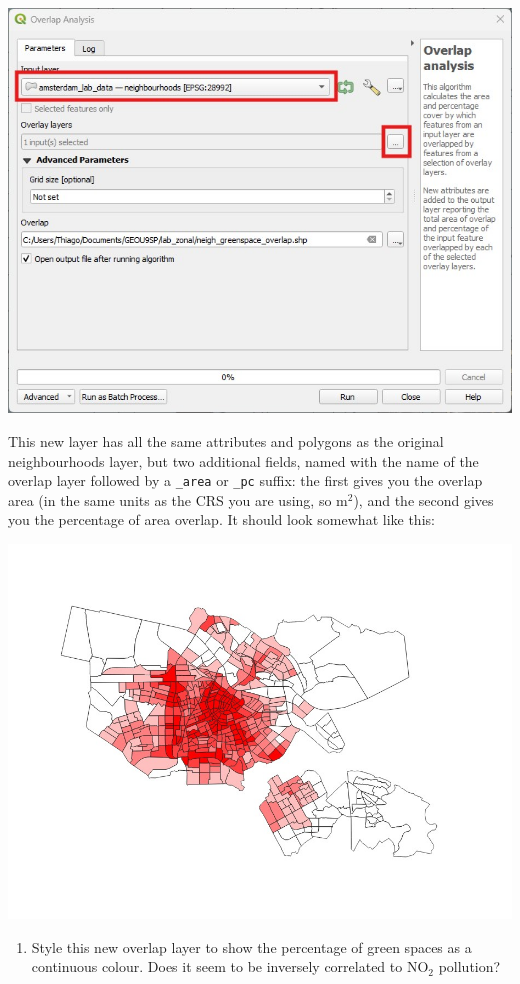 \documentclass[
  letterpaper,
  DIV=11,
  numbers=noendperiod]{scrreprt}
\providecommand{\tightlist}{%
  \setlength{\itemsep}{0pt}\setlength{\parskip}{0pt}}\usepackage{longtable,booktabs,array}
\begin{document}
\includegraphics{images/lab_12/lab12_fig2_overlap.jpg}

This new layer has all the same attributes and polygons as the original
neighbourhoods layer, but two additional fields, named with the name of
the overlap layer followed by a \texttt{\_area} or \texttt{\_pc} suffix:
the first gives you the overlap area (in the same units as the CRS you
are using, so m\(^2\)), and the second gives you the percentage of area
overlap. It should look somewhat like this:

\includegraphics{images/lab_12/lab12_fig_no2-per-neig.jpg}

\begin{enumerate}
\def\labelenumi{(\arabic{enumi})}
\setcounter{enumi}{324}
\tightlist
\item
  Style this new overlap layer to show the percentage of green spaces as
  a continuous colour. Does it seem to be inversely correlated to
  NO\(_2\) pollution?
\end{enumerate}
\end{document}
